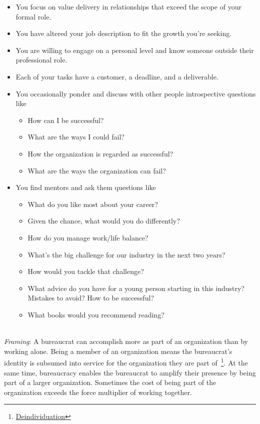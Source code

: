 \begin{itemize}
    \item You focus on value delivery in relationships that exceed the scope of your formal role.
\item You have altered your job description to fit the growth you're seeking.
\item You are willing to engage on a personal level and know someone outside their professional role.
\item Each of your tasks have a customer, a deadline, and a deliverable.
\item You occasionally ponder and discuss with other people introspective questions like
\begin{itemize}
    \item How can I be successful?
    \item What are the ways I could fail?
    \item How the organization is regarded as successful?
    \item What are the ways the organization can fail?
\end{itemize}
\item You find mentors and ask them questions like
\begin{itemize}
    \item What do you like most about your career? 
    \item Given the chance, what would you do differently?
    \item How do you manage work/life balance?
    \item What's the big challenge for our industry in the next two years?
    \item How would you tackle that challenge?
    \item What advice do you have for a young person starting in this industry? Mistakes to avoid?  How to be successful?
    \item What books would you recommend reading?
\end{itemize}
\end{itemize}

\ \\
\textit{Framing}: A bureaucrat can accomplish more as part of an organization than by working alone. Being a member of an organization means the bureaucrat's identity is subsumed into service for the organization they are part of~\footnote{\href{https://en.wikipedia.org/wiki/Deindividuation}{Deindividuation}}. At the same time, bureaucracy enables the bureaucrat to amplify their presence by being part of a larger organization.  Sometimes the cost of being part of the organization exceeds the force multiplier of working together. 

